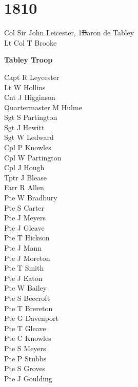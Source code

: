 \chapter*{1810}

\begin{multicols}{2}
  \noindent
  Col Sir John Leicester, 1\st Baron de Tabley \\
  Lt Col T Brooke \\
\end{multicols}

\begin{center}
  \Large
  \textbf{Tabley Troop}
\end{center}

\begin{multicols}{2}
  \noindent
  Capt R Leycester \\
  Lt W Hollins \\
  Cnt J Higginson \\
  Quartermaster M Hulme \\
  Sgt S Partington \\
  Sgt J Hewitt \\
  Sgt W Ledward \\
  Cpl P Knowles \\
  Cpl W Partington \\
  Cpl J Hough \\
  Tptr J Blease \\
  Farr R Allen \\
  Pte W Bradbury \\
  Pte S Carter \\
  Pte J Meyers \\
  Pte J Gleave \\
  Pte T Hickson \\
  Pte J Mann \\
  Pte J Moreton \\
  Pte T Smith \\
  Pte J Eaton \\
  Pte W Bailey \\
  Pte S Beecroft \\
  Pte T Brereton \\
  Pte G Davenport \\
  Pte T Gleave \\
  Pte C Knowles \\
  Pte S Meyers \\
  Pte P Stubbs \\
  Pte S Groves \\
  Pte J Goulding \\

\end{multicols}
